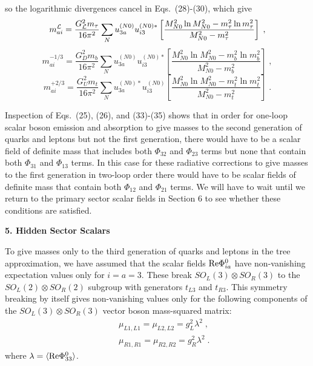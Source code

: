 so the logarithmic divergences cancel in Eqs.~(28)-(30), which give
\begin{equation}
m^{\cal L}_{ai}=\frac{G_{\cal L}^2m_\tau }{16 \pi^2}\sum_{N}  u_{3a}^{(N0)}u_{i3}^{(N0)*}\left[\frac{M_{N0}^2\ln M_{N0}^2-m_\tau^2\ln m_\tau^2}{M_{N0}^2-m_\tau^2}\right]
 \;,
\end{equation}
\begin{equation}
m^{-1/3}_{ai}=\frac{G^2_Dm_b}{16 \pi^2}\sum_{N}  u_{3a}^{(N0)}u_{i3}^{(N0)*}\left[\frac{M_{N0}^2\ln M_{N0}^2-m_b^2\ln m_b^2}{M_{N0}^2-m_b^2}\right]
 \;,
\end{equation}
\begin{equation}
m^{+2/3}_{ai}=\frac{G_U^2m_t}{16 \pi^2}\sum_{N}  u_{3a}^{(N0)*}u_{i3}^{(N0)}\left[\frac{M_{N0}^2\ln M_{N0}^2-m_t^2\ln m_t^2}{M_{N0}^2-m_t^2}\right]
 \;.
\end{equation}

Inspection of Eqs.~(25), (26), and (33)-(35) shows that in order for  one-loop scalar boson emission and absorption to give masses to the second generation of quarks and leptons but not the first generation, there would have to be a scalar field of definite mass that includes both $ \Phi_{32}$  and $ \Phi_{23}$ terms but none that contain  both $ \Phi_{31}$  and $ \Phi_{13}$ terms.  In this case for these radiative corrections to give masses to the first generation in two-loop order there would have to be scalar fields of definite mass that contain both $ \Phi_{12}$  and $ \Phi_{21}$ terms.  
We will have to wait until we return to the primary sector scalar fields in Section 6  to see whether these conditions are satisfied.






\begin{center}
{\bf 5. Hidden Sector Scalars}
\end{center}






To give masses only to the third generation of quarks and leptons in the tree approximation, we have assumed that the scalar fields ${\rm Re}\Phi^0_{ia}$ have non-vanishing expectation values only for $i=a=3$.  These break $SO_L(3)\otimes  SO_R(3)$ to the  $SO_L(2)\otimes  SO_R(2)$ subgroup with generators $t_{L3}$ and $t_{R3}$.  This symmetry breaking by itself gives non-vanishing values only for the following components of the $SO_L(3)\otimes  SO_R(3)$ vector boson mass-squared matrix: 
\begin{eqnarray*}
 &&\mu_{L1,L1}=\mu_{L2,L2}=g_L^2 \lambda^2\;,\\&&
\mu_{R1,R1}=\mu_{R2,R2}=g_R^2 \lambda^2\;.
\end{eqnarray*}
 where $\lambda=\langle{\rm Re}\Phi^0_{33}\rangle$.  

